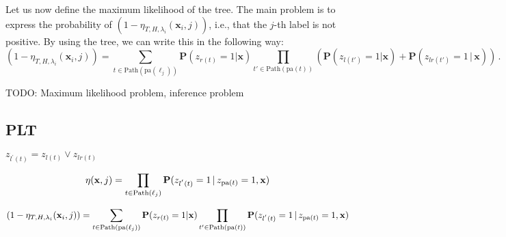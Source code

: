 \documentclass{article}
\newcommand{\R}{\mathbb{R}}
\newcommand{\cH}{\mathcal{H}}
\newcommand{\cL}{\mathcal{L}}
\newcommand{\path}{\text{Path}}
\newcommand{\Path}[1]{\mathrm{Path}(#1)}
\newcommand{\pa}[1]{\mathrm{pa}(#1)}
\newcommand{\leaves}{d}
\renewcommand{\vec}[1]{\mathbf{#1}}
\newcommand{\bx}{\mathbf{x}}
\newcommand{\by}{\vec{y}}
\newcommand{\prob}{\mathbf{P}}
\newcommand{\given}{\, | \,}
\newcommand{\Algo}[1]{\textsc{#1}}
\begin{document}
Let us now define the maximum likelihood of the tree. The main problem is to express the probability of  $(1-\eta_{T,H,\lambda_i} ( \bx_i , j ))$, i.e., that the $j$-th label is not positive. By using the tree, we can write this in the following way:
\[
(1-\eta_{T,H,\lambda_i} ( \bx_i , j )) = \sum_{t \in \Path{\pa{\ell_j}}}   \prob(z_{r(t)} = 1 | \bx)  \prod_{t' \in \Path{\pa{t}}} \left ( \prob(z_{l(t')} = 1 | \bx) + \prob(z_{lr(t')} = 1 \given \bx) \right )  \,.
\]

TODO: Maximum likelihood problem, inference problem


\subsection{\Algo{PLT}}

$z_{l^{\prime}(t)} = z_{l(t)} \vee z_{lr(t)}$ 

\begin{equation}
\eta(\bx, j) = \prod_{t \in \Path{\ell_j}} \prob(z_{l^{'}(t)} = 1 \given z_{\pa{t}} =1, \bx)\notag 
\end{equation}


\[
(1-\eta_{T,H,\lambda_i} ( \bx_i , j )) = \sum_{t \in \Path{\pa{\ell_j}}}   \prob(z_{r(t)} = 1 | \bx)  \prod_{t' \in \Path{\pa{t}}} \prob(z_{l^{'}(t)} = 1 \given z_{\pa{t}} =1, \bx)  \notag
\]





\end{document}

